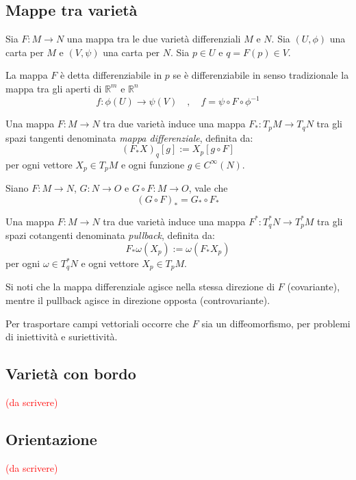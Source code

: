 \subsection{Mappe tra varietà}
Sia $F : M \to N$ una mappa tra le due varietà differenziali $M$ e $N$.
Sia $(U,\phi)$ una carta per $M$ e $(V,\psi)$ una carta per $N$. Sia $p \in U$ e
$q = F(p) \in V$.
\begin{definition}
   La mappa $F$ è detta differenziabile in $p$ se è differenziabile
   in senso tradizionale la mappa tra gli aperti di $\mathbb{R}^m$ e
   $\mathbb{R}^n$
   $$ f : \phi(U) \to \psi(V) \quad , \quad f = \psi \circ F \circ \phi^{-1} $$
\end{definition}

\begin{definition}
   Una mappa $F : M \to N$ tra due varietà induce una mappa
   $F_* : T_p M \to T_q N$ tra gli spazi tangenti denominata
   \emph{mappa differenziale}, definita da:
   $$ (F_*X)_q [g] := X_p [g \circ F] $$
   per ogni vettore $X_p \in T_p M$ e ogni funzione $g \in C^\infty(N)$.
\end{definition}

Siano $F : M \to N$, $G : N \to O$ e $G \circ F : M \to O$, vale che
   $$ (G \circ F)_* = G_* \circ F_* $$

\begin{definition}
   Una mappa $F : M \to N$ tra due varietà induce una mappa
   $F^* : T^*_q N \to T^*_p M$ tra gli spazi cotangenti denominata
   \emph{pullback}, definita da:
   $$ F_*\omega (X_p) := \omega (F_* X_p) $$
   per ogni $\omega \in T^*_q N$ e ogni vettore $X_p \in T_p M$.
\end{definition}

Si noti che la mappa differenziale agisce nella stessa direzione di $F$ (covariante),
mentre il pullback agisce in direzione opposta (controvariante).

Per trasportare campi vettoriali occorre che $F$ sia un diffeomorfismo, per problemi
di iniettività e suriettività.\\

\subsection{Varietà con bordo}
\textcolor{red}{(da scrivere)}
\subsection{Orientazione}
\textcolor{red}{(da scrivere)}
